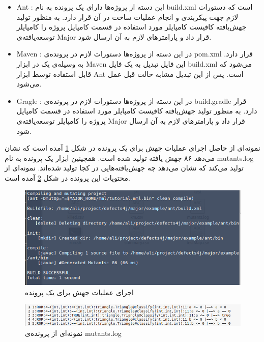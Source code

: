 \begin{enumerate}
\begin{itemize}
	\item
	Ant : 
	این دسته از پروژه‌ها دارای یک پرونده به نام build.xml است که دستورات لازم جهت پیکربندی و انجام عملیات ساخت در آن قرار دارد. به منظور تولید جهش‌یافته کافیست کامپایلر مورد استفاده در قسمت کامپایل پروژه را کامپایلر توسعه‌یافته‌ی Major قرار داد و پارامترهای لازم به آن ارسال شود. 
	\item Maven : 
	در این دسته از پروژه‌ها دستورات لازم در پرونده‌ی pom.xml قرار دارد.  به وسیله‌ی  یک  در ابزار Maven این فایل تبدیل به یک فایل build.xml می‌شود که قابل استفاده توسط ابزار Ant است. پس از این تبدیل مشابه حالت قبل عمل می‌شود. 	
	\item Gragle : 
	در این دسته از پروژه‌ها دستورات لازم در پرونده‌ی  build.gradle قرار دارد.  به منظور تولید جهش‌یافته کافیست کامپایلر مورد استفاده در قسمت کامپایل پروژه را کامپایلر توسعه‌یافته‌ی Major قرار داد و پارامترهای لازم به آن ارسال شود. 
\end{itemize}

نمونه‌ای از حاصل اجرای  عملیات جهش برای یک پرونده در شکل \ref{fig:major-mutant}  آمده است   که نشان می‌دهد ۸۶ جهش یافته تولید شده است. همچینین ابزار یک پرونده به نام mutants.log تولید می‌کند که نشان می‌دهد چه جهش‌یافته‌هایی در کجا تولید شده‌اند. نمونه‌ای از محتویات این پرونده در شکل \ref{fig:major-log}  آمده است. 

\begin{figure}[H]
	\centering
	\includegraphics[width=.8\textwidth]{img/case_study/major-mutant.png}
	\caption{اجرای عملیات جهش برای یک پرونده}
	\label{fig:major-mutant}
\end{figure}

\begin{figure}[H]
	\centering
	\includegraphics[width=.8\textwidth]{img/case_study/major-log.png}
	\caption{نمونه‌ای از پرونده‌ی mutants.log}
	\label{fig:major-log}
\end{figure}


\end{enumerate}
